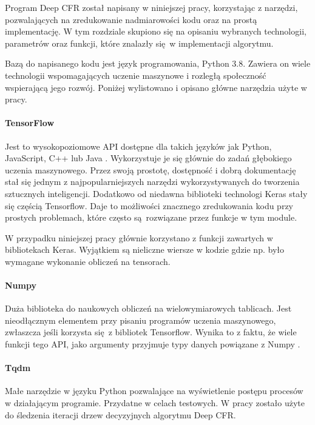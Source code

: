 \documentclass[12pt,oneside,a4paper]{report}
\begin{document}
Program Deep CFR został napisany w niniejszej pracy, korzystając z narzędzi,
pozwalających na zredukowanie nadmiarowości kodu oraz na prostą implementację.
W tym rozdziale skupiono się na opisaniu wybranych technologii, parametrów oraz funkcji, 
które znalazły się w implementacji algorytmu.

Bazą do napisanego kodu jest język programowania, Python 3.8. Zawiera on wiele
technologii wspomagających uczenie maszynowe i rozległą społeczność wspierającą jego rozwój.
Poniżej 
wylistowano i opisano główne narzędzia użyte w pracy.

\paragraph{TensorFlow}

Jest to wysokopoziomowe API dostępne dla takich języków jak Python, JavaScript, C++ lub Java
\cite{tensorflow}.
Wykorzystuje je się głównie do zadań głębokiego uczenia maszynowego. Przez swoją prostotę, dostępność 
i dobrą
dokumentację stał się jednym z najpopularniejszych narzędzi wykorzystywanych do tworzenia
sztucznych inteligencji. Dodatkowo od niedawna biblioteki technologi Keras stały się częścią Tensorflow.
Daje to możliwości znacznego
zredukowania kodu przy prostych problemach, które często są rozwiązane przez funkcje w tym module. 


W przypadku niniejszej pracy głównie korzystano z funkcji zawartych w bibliotekach Keras. Wyjątkiem 
są nieliczne wiersze w kodzie gdzie np. było wymagane wykonanie obliczeń na tensorach.

\paragraph{Numpy}

Duża biblioteka do naukowych obliczeń na wielowymiarowych tablicach. Jest nieodłącznym
elementem przy pisaniu programów uczenia maszynowego, zwłaszcza jeśli korzysta się z 
bibliotek Tensorflow. Wynika to z faktu, że wiele funkcji tego API, jako argumenty przyjmuje
typy danych powiązane z Numpy \cite{tensorflow}.



\paragraph{Tqdm}
Małe narzędzie w języku Python pozwalające na wyświetlenie postępu procesów w działającym 
programie.
Przydatne w celach
testowych. W pracy zostało użyte do śledzenia iteracji drzew decyzyjnych 
algorytmu Deep CFR.
\end{document}
